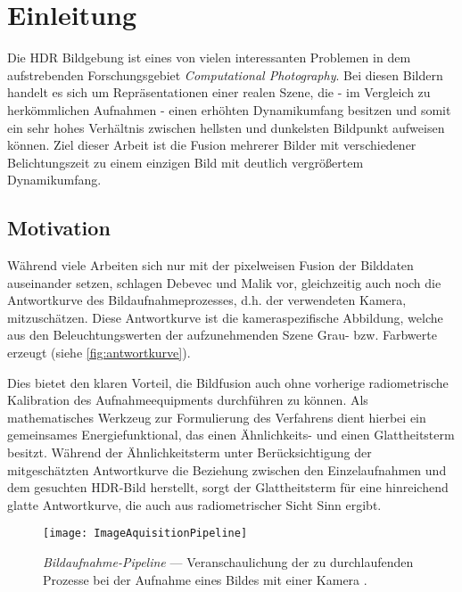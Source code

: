 \glsresetall


\chapter{Einleitung}
Die \gls{HDR} Bildgebung ist eines von vielen interessanten Problemen in dem aufstrebenden Forschungsgebiet \textit{Computational Photography}. Bei diesen Bildern handelt es sich um Repräsentationen einer realen Szene, die - im Vergleich zu herkömmlichen Aufnahmen - einen erhöhten Dynamikumfang besitzen und somit ein sehr hohes Verhältnis zwischen hellsten und dunkelsten Bildpunkt aufweisen können. Ziel dieser Arbeit ist die Fusion mehrerer Bilder mit verschiedener Belichtungszeit zu einem einzigen Bild mit deutlich vergrößertem Dynamikumfang.
 
\section{Motivation}


Während viele Arbeiten sich nur mit der pixelweisen Fusion der Bilddaten auseinander setzen, schlagen Debevec und Malik \cite{paper} vor, gleichzeitig auch noch die Antwortkurve des Bildaufnahmeprozesses, d.h. der verwendeten Kamera, mitzuschätzen. Diese Antwortkurve ist die kameraspezifische Abbildung, welche aus den Beleuchtungswerten der aufzunehmenden Szene Grau- bzw. Farbwerte erzeugt (siehe \autoref{fig:antwortkurve}).

Dies bietet den klaren Vorteil, die Bildfusion auch ohne vorherige radiometrische Kalibration des Aufnahmeequipments durchführen zu können. Als mathematisches Werkzeug zur Formulierung des Verfahrens dient hierbei ein gemeinsames Energiefunktional, das einen Ähnlichkeits- und einen  Glattheitsterm besitzt. Während der Ähnlichkeitsterm unter Berücksichtigung der mitgeschätzten Antwortkurve die Beziehung zwischen den Einzelaufnahmen und dem gesuchten HDR-Bild herstellt, sorgt der Glattheitsterm für eine hinreichend glatte Antwortkurve, die auch aus radiometrischer Sicht Sinn ergibt.

\begin{figure}
  \begin{center}
    \texttt{[image: ImageAquisitionPipeline]}
    \caption{\textit{Bildaufnahme-Pipeline} --- Veranschaulichung der zu durchlaufenden Prozesse bei der Aufnahme eines Bildes mit einer Kamera  \cite[S.2]{paper}.}
    \label{fig:antwortkurve}
  \end{center}
\end{figure}


